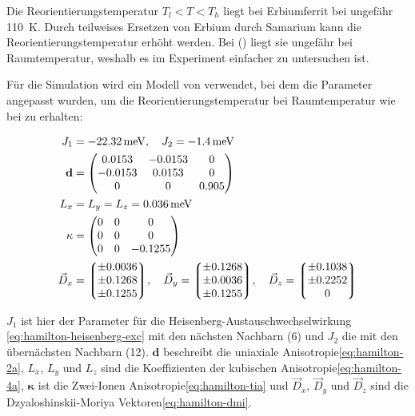 \documentclass[main.tex]{subfiles}
\begin{document}

Die Reorientierungstemperatur \(T_l < T < T_h\) liegt bei Erbiumferrit bei ungefähr \SI{110}{\kelvin}\cite{Deng2015}. Durch teilweises Ersetzen von Erbium durch Samarium kann die Reorientierungstemperatur erhöht werden. Bei () liegt sie ungefähr bei Raumtemperatur, weshalb es im Experiment einfacher zu untersuchen ist.


Für die Simulation wird ein Modell von  verwendet, bei dem die Parameter  angepasst wurden, um die Reorientierungstemperatur bei Raumtemperatur wie bei  zu erhalten:

\begin{align}
	J_1             & = \SI{-22,32}{\milli\electronvolt}, \quad J_2 =
	\SI{-1,4}{\milli\electronvolt}
	\\
	\mathbf{d}      & = \mqty(
	\num{0.0153}    & \num{-0.0153}                                   & 0
	\\
	\num{-0.0153}   & \num{0.0153}                                    & 0
	\\
	0               & 0                                               &
	\num{0.905})
	\\
	L_x             & = L_y = L_z = \SI{0.036}{\milli\electronvolt}
	\\
	\mathbf{\kappa} & = \mqty(
	0               & 0                                               & 0
	\\
	0               & 0                                               & 0
	\\
	0               & 0                                               &
	\num{-0.1255})
	\\
	\vec{D}_x       & = \mqty*(\num{\pm 0.0036}
	\\ \num{\pm 0.1268} \\ \num{\pm
		0.1255}), \quad
	\vec{D}_y = \mqty*(\num{\pm 0.1268}
	\\ \num{\pm 0.0036} \\ \num{\pm
		0.1255}), \quad
	\vec{D}_z = \mqty*(\num{\pm 0.1038}
	\\ \num{\pm 0.2252} \\ 0)
\end{align}

\(J_1\) ist hier der Parameter für die Heisenberg-Austauschwechselwirkung \eqref{eq:hamilton-heisenberg-exc} mit den nächsten Nachbarn (6) und \(J_2\) die mit den übernächsten Nachbarn (12). \(\mathbf{d}\) beschreibt die uniaxiale Anisotropie\eqref{eq:hamilton-2a}, \(L_x\), \(L_y\) und \(L_z\) sind die Koeffizienten der kubischen Anisotropie\eqref{eq:hamilton-4a}, \(\mathbf{\kappa}\) ist die Zwei-Ionen Anisotropie\eqref{eq:hamilton-tia} und \(\vec{D}_x\), \(\vec{D}_y\) und \(\vec{D}_z\) sind die Dzyaloshinskii-Moriya Vektoren\eqref{eq:hamilton-dmi}.
\end{document}
